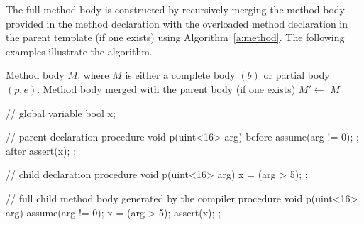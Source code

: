 \documentclass{report}
\begin{document}
The full method body is constructed by recursively merging the method 
body provided in the method declaration with the overloaded method 
declaration in the parent template (if one exists) using 
Algorithm~\ref{a:method}.  The following examples illustrate the algorithm.


\begin{algorithm}
    \begin{algorithmic}[1]
         Method body $M$, where $M$ is 
        either a complete body $(b)$ or partial body $(p,e)$.
         Method body merged with the parent body (if one exists)
          \State $M' \gets$ 
             $M$
          \EndIf
            \EndCase
            \EndCase
            \EndCase
            \EndCase
          \EndSwitch 
        \EndFunction
    \end{algorithmic}
    \caption{}\label{a:method}
\end{algorithm}

\begin{tsllisting}{}
// global variable
bool x;

// parent declaration
procedure void p(uint<16> arg)
before{ 
    assume(arg != 0);
};
after{
    assert(x);
};

// child declaration
procedure void p(uint<16> arg)
{
    x = (arg > 5);
};

// full child method body generated by the compiler
procedure void p(uint<16> arg)
{
    assume(arg != 0);
    x = (arg > 5);
    assert(x);
};
\end{tsllisting}
\end{document}
